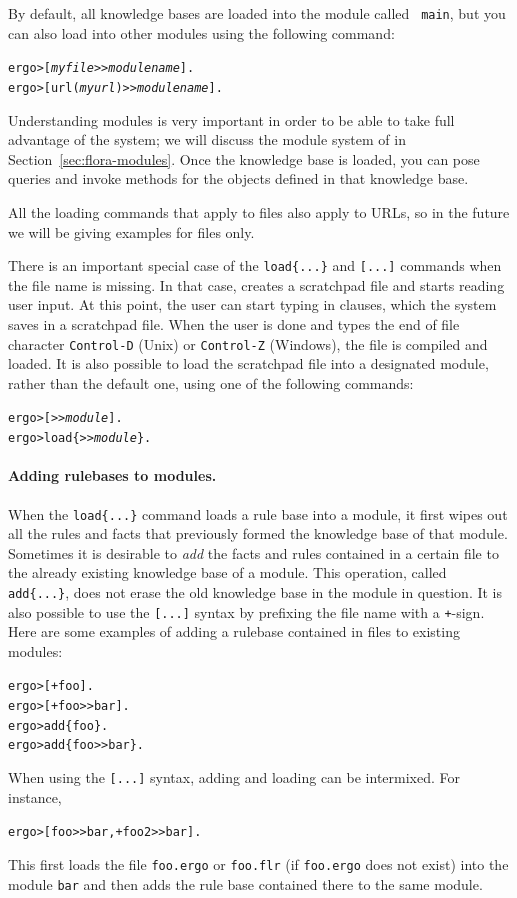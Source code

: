 \documentclass[11pt]{article}
\newcommand{\ERGO}{\mbox{\smaller{\ensuremath{\cal{E}}\smaller{{\sc{RGO}}}}}\xspace}
\newcommand{\FLSYSTEM}{\ERGO}
\newcommand{\prompt}{ergo> }
\newcommand{\flrext}{flr\xspace}
\newcommand{\ergoext}{ergo\xspace}
\begin{document}
By default, all \FLSYSTEM knowledge bases are loaded into the module called {\tt
  main}, but you can also load into other modules using the following
command:
\begin{alltt}
  \prompt  [\textnormal{\textit{myfile}}>{}>\textnormal{\textit{modulename}}].
  \prompt  [url(\textnormal{\textit{myurl}})>{}>\textnormal{\textit{modulename}}].
\end{alltt}
Understanding \FLSYSTEM modules is very important in order to be able to take
full advantage of the system; we will discuss the module system of \FLSYSTEM
in Section~\ref{sec:flora-modules}.  Once the knowledge base is loaded, you can
pose queries and invoke methods for the objects defined in that knowledge
base.

All the loading commands that apply to files also apply to URLs, so in the
future we will be giving examples for files only.

There is an important special case of the {\tt load\{...\}} and {\tt [...]}
commands when the file name is missing. In that case,
\FLSYSTEM creates a scratchpad file and starts reading user
input. At this point, the user can start typing in \FLSYSTEM clauses, which
the system saves in a scratchpad file. When the user is done and types the
end of file character {\tt Control-D} (Unix) or {\tt Control-Z} (Windows),
the file is compiled and loaded. It is also possible to load the scratchpad
file into a designated module, rather than the default one, using one of the
following commands:
\begin{alltt}
  \prompt [>{}>\textnormal{\emph{module}}].
  \prompt load\{>{}>\textnormal{\emph{module}}\}.
\end{alltt}

\paragraph{Adding rulebases to modules.}
When the {\tt load\{...\}} command loads a rule base into a module, it first wipes
out all the rules and facts that previously formed the knowledge base of
that module. Sometimes it is desirable to \emph{add} the facts and
rules contained in a certain file to the already existing knowledge base of
a module. This operation, called {\tt add\{...\}}, does not erase the old
knowledge base in the module in question.  It is also possible to use the
{\tt [...]} syntax by prefixing the file name with a {\tt +}-sign. Here are
some examples of adding a rulebase contained in files to existing
modules:
\index{\tt [file]}
\begin{alltt}
     \prompt [+foo].
     \prompt [+foo>{}>bar].
     \prompt add\{foo\}.
     \prompt add\{foo>{}>bar\}.
\end{alltt}
When using the {\tt [...]} syntax, adding and loading can be
intermixed. For instance, 
\begin{alltt}
      \prompt [foo>{}>bar, +foo2>{}>bar].
\end{alltt}
This first loads the file \texttt{foo.\ergoext} or
\texttt{foo.\flrext} (if \texttt{foo.\ergoext} does not exist)
into the module {\tt bar} and then
adds the rule base contained there to the same module.
\end{document}
